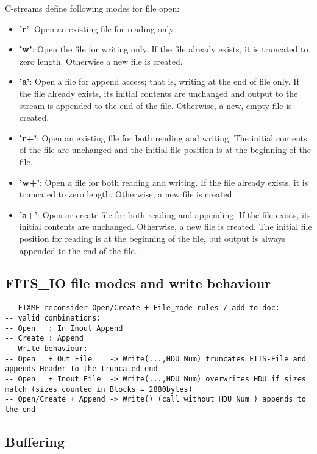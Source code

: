 \documentclass[a4paper,10pt]{article}
\begin{document}
C-streams define following modes for file open:
\begin{itemize}
\item \textbf{'r'}: Open an existing file for reading only. 
\item \textbf{'w'}: Open the file for writing only. If the file already exists, it is truncated to zero length. Otherwise a new file is created. 
\item \textbf{'a'}: Open a file for append access; that is, writing at the end of file only. If the file already exists, its initial contents are unchanged and output to the stream is appended to the end of the file. Otherwise, a new, empty file is created. 
\item \textbf{'r+'}: Open an existing file for both reading and writing. The initial contents of the file are unchanged and the initial file position is at the beginning of the file. 
\item \textbf{'w+'}: Open a file for both reading and writing. If the file already exists, it is truncated to zero length. Otherwise, a new file is created. 
\item \textbf{'a+'}: Open or create file for both reading and appending. If the file exists, its initial contents are unchanged. Otherwise, a new file is created. The initial file position for reading is at the beginning of the file, but output is always appended to the end of the file. 
\end{itemize}



\subsection{FITS\_IO file modes and write behaviour}

\begin{verbatim}
-- FIXME reconsider Open/Create + File_mode rules / add to doc:
-- valid combinations:
-- Open   : In Inout Append
-- Create : Append
-- Write behaviour:
-- Open   + Out_File    -> Write(...,HDU_Num) truncates FITS-File and appends Header to the truncated end
-- Open   + Inout_File  -> Write(...,HDU_Num) overwrites HDU if sizes match (sizes counted in Blocks = 2880bytes)
-- Open/Create + Append -> Write() (call without HDU_Num ) appends to the end
\end{verbatim}

\subsection{Buffering}
\label{sec:webbrowser}
\end{document}
